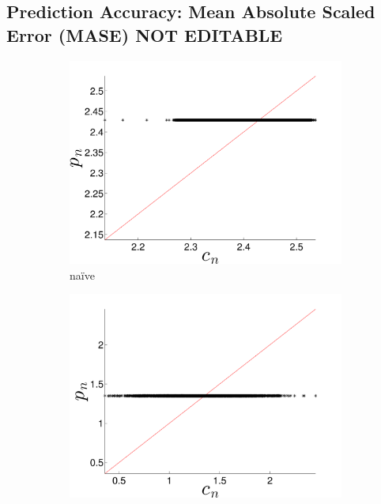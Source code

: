 




\subsection{Prediction Accuracy: Mean Absolute Scaled Error (MASE) {\color{red} NOT EDITABLE}}
\label{sec:accuracy}







\begin{figure}[htbp]
  \centering
      \begin{subfigure}{0.48\columnwidth}
    \includegraphics[width=\columnwidth]{figs/colMeanForecast}
    \caption{\col na\"ive }
    \label{fig:gccMEAN}
  \end{subfigure}%
   \begin{subfigure}{0.48\columnwidth}
    \includegraphics[width=\columnwidth]{figs/gccMeanForecast}

\end{subfigure}
\end{figure}
